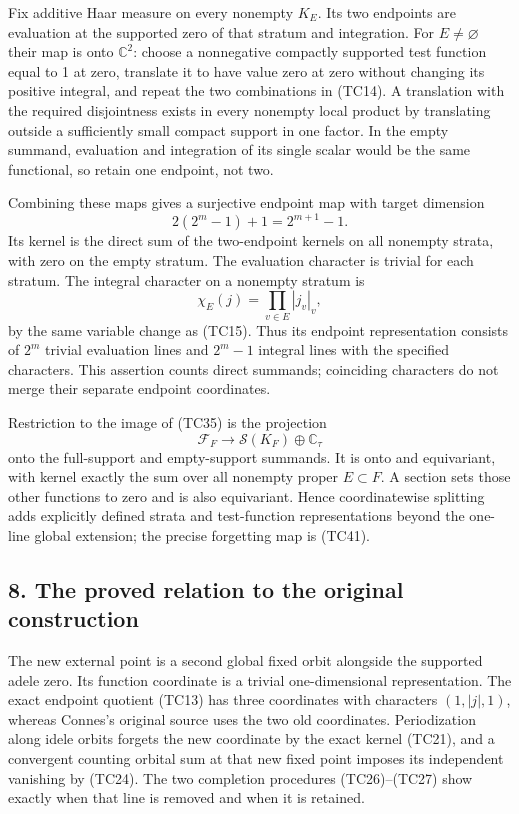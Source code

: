 \documentclass[
  10pt,
]{article}
\begin{document}
Fix additive Haar measure on every nonempty \(K_E\). Its two endpoints
are evaluation at the supported zero of that stratum and integration.
For \(E\ne\varnothing\) their map is onto \(\mathbb C^2\): choose a
nonnegative compactly supported test function equal to 1 at zero,
translate it to have value zero at zero without changing its positive
integral, and repeat the two combinations in (TC14). A translation with
the required disjointness exists in every nonempty local product by
translating outside a sufficiently small compact support in one factor.
In the empty summand, evaluation and integration of its single scalar
would be the same functional, so retain one endpoint, not two.

Combining these maps gives a surjective endpoint map with target
dimension \[
2(2^m-1)+1=2^{m+1}-1.
\tag{TC39}
\] Its kernel is the direct sum of the two-endpoint kernels on all
nonempty strata, with zero on the empty stratum. The evaluation
character is trivial for each stratum. The integral character on a
nonempty stratum is \[
\chi_E(j)=\prod_{v\in E}|j_v|_v,
\tag{TC40}
\] by the same variable change as (TC15). Thus its endpoint
representation consists of \(2^m\) trivial evaluation lines and
\(2^m-1\) integral lines with the specified characters. This assertion
counts direct summands; coinciding characters do not merge their
separate endpoint coordinates.

Restriction to the image of (TC35) is the projection \[
\mathcal F_F\longrightarrow\mathcal S(K_F)\oplus\mathbb C_\tau
\tag{TC41}
\] onto the full-support and empty-support summands. It is onto and
equivariant, with kernel exactly the sum over all nonempty proper
\(E\subset F\). A section sets those other functions to zero and is also
equivariant. Hence coordinatewise splitting adds explicitly defined
strata and test-function representations beyond the one-line global
extension; the precise forgetting map is (TC41).

\subsection{8. The proved relation to the original
construction}\label{the-proved-relation-to-the-original-construction}

The new external point is a second global fixed orbit alongside the
supported adele zero. Its function coordinate is a trivial
one-dimensional representation. The exact endpoint quotient (TC13) has
three coordinates with characters \((1,|j|,1)\), whereas Connes's
original source uses the two old coordinates. Periodization along idele
orbits forgets the new coordinate by the exact kernel (TC21), and a
convergent counting orbital sum at that new fixed point imposes its
independent vanishing by (TC24). The two completion procedures
(TC26)--(TC27) show exactly when that line is removed and when it is
retained.
\end{document}
